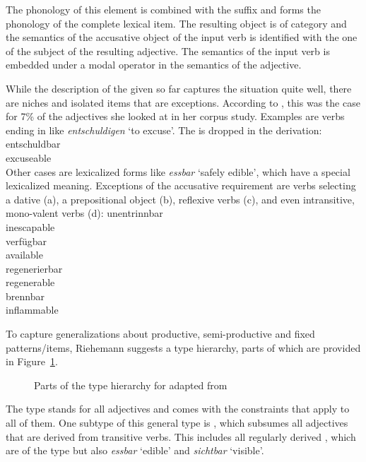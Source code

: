 \documentclass[output=paper
	        ,collection
	        ,collectionchapter
 	        ,biblatex
                ,babelshorthands
                ,newtxmath
                ,draftmode
                ,colorlinks, citecolor=brown
]{langscibook}
\begin{document}
The phonology of this element  is combined with the suffix  and forms the
phonology of the complete lexical item. The resulting object is of category  and the
semantics of the accusative object of the input verb  is identified with the one of the subject of the resulting adjective. The semantics of the
input verb  is embedded under a modal operator in the semantics of the adjective. 

While the description of the \bard given so far captures
the situation quite well, there are niches and isolated items that are exceptions. According to
\citet[]{Riehemann98a}, this was the case for 7\% of the adjectives she looked at in her
corpus study. Examples are verbs ending in  like \emph{entschuldigen} `to excuse'. The
 is dropped in the derivation:
\ea
\gll entschuldbar\\
     excuseable\\
\z
Other cases are lexicalized forms like \emph{essbar} `safely edible', which have a special
lexicalized meaning. Exceptions of the accusative requirement are verbs selecting a dative
(a), a prepositional object (b), reflexive verbs (c), and even intransitive, mono-valent verbs (d):
\eal
\ex 
\gll unentrinnbar\\
     inescapable\\
\ex 
\gll verfügbar\\
     available\\
\ex
\gll regenerierbar\\
     regenerable\\
\ex 
\gll brennbar\\
     inflammable\\
\zl 

To capture generalizations about productive, semi-productive and fixed patterns/items, Riehemann
suggests a type hierarchy, parts of which are provided in
Figure~\ref{fig-bar-Riehemann}.
\begin{figure}
\centerfit{%
\begin{forest}
type hierarchy
[bar-adj
  [trans-bar-adj
    [reg-bar-adj]
    [essbar]
    [\ldots]]
  [dative-bar-adj
    [unentrinnbar]
    [\ldots]]
  [prep-bar-adj
    [verfügbar]]
  [intr-bar-adj
    [brennbar]
    [\ldots]]]
\end{forest}}
\caption{\label{fig-bar-Riehemann}Parts of the type hierarchy for \bard adapted from \citet[]{Riehemann98a}}
\end{figure}
The type  stands for all  adjectives and comes with the constraints that
apply to all of them. One subtype of this general type is , which subsumes all
adjectives that are derived from transitive verbs. This includes all regularly derived \baradjs,
which are of the type  but also \emph{essbar} `edible' and \emph{sichtbar} `visible'.
\end{document}

